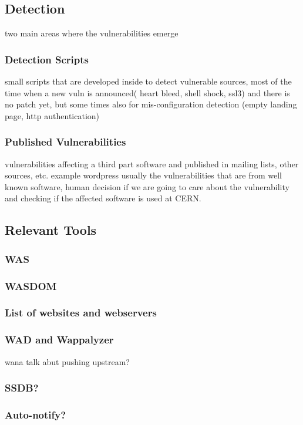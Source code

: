 \subsection{Detection}
two main areas where the vulnerabilities emerge
\subsubsection{Detection Scripts}
small scripts that are developed inside to detect vulnerable sources, most of the time when a new vuln is announced( heart bleed, shell shock, ssl3) and there is no patch yet, but some times also for mis-configuration detection (empty landing page, http authentication)
\subsubsection{Published Vulnerabilities}
vulnerabilities affecting a third part software and published in mailing lists, other sources, etc. example wordpress
usually the vulnerabilities that are from well known software, human decision if we are going to care about the vulnerability and checking if the affected software is used at CERN.

\subsection{Relevant Tools}
\subsubsection{WAS}
\subsubsection{WASDOM}
\subsubsection{List of websites and webservers}
\subsubsection{WAD and Wappalyzer}
\label{wad_section}
wana talk abut pushing upstream?
\subsubsection{SSDB?}
\subsubsection{Auto-notify?}

